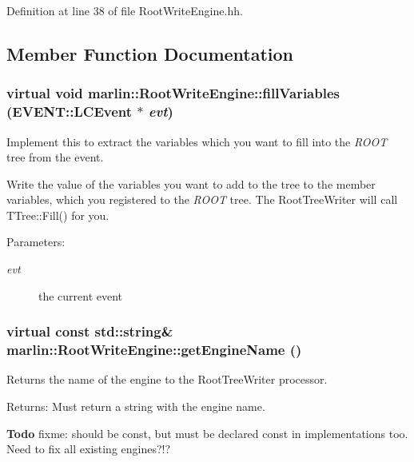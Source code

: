 Definition at line 38 of file Root\-Write\-Engine.hh.

\subsection{Member Function Documentation}
\subsubsection{\setlength{\rightskip}{0pt plus 5cm}virtual void marlin::Root\-Write\-Engine::fill\-Variables (EVENT::LCEvent $\ast$ {\em evt})\hspace{0.3cm}{\tt  [pure virtual]}}\label{classmarlin_1_1RootWriteEngine_b8cb6e6006b8e5820b1f3959f5abb15a}


Implement this to extract the variables which you want to fill into the {\em ROOT\/} tree from the event. 

Write the value of the variables you want to add to the tree to the member variables, which you registered to the {\em ROOT\/} tree. The Root\-Tree\-Writer will call TTree::Fill() for you. \begin{Desc}
\item[Parameters:]
\begin{description}
\item[{\em evt}]the current event \end{description}
\end{Desc}
\subsubsection{\setlength{\rightskip}{0pt plus 5cm}virtual const std::string\& marlin::Root\-Write\-Engine::get\-Engine\-Name ()\hspace{0.3cm}{\tt  [pure virtual]}}\label{classmarlin_1_1RootWriteEngine_e9bd7c517e368d121eb364049715e542}


Returns the name of the engine to the Root\-Tree\-Writer processor. 

\begin{Desc}
\item[Returns:]Must return a string with the engine name. \end{Desc}
\begin{Desc}
\item[\bf{Todo}]fixme: should be const, but must be declared const in implementations too. Need to fix all existing engines?!? \end{Desc}
